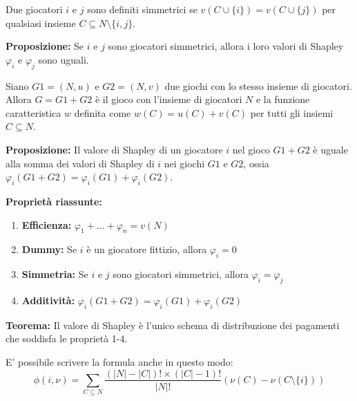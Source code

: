 \begin{definition}[Proprietà 3]

    Due giocatori $i$ e $j$ sono definiti simmetrici se $v(C \cup \{i\}) = v(C \cup
        \{j\})$ per qualsiasi insieme $C \subseteq N \setminus \{i, j\}$.

    \textbf{Proposizione:} Se $i$ e $j$ sono giocatori simmetrici, allora i loro valori di Shapley $\varphi_i$ e $\varphi_j$ sono uguali.

\end{definition}

\begin{definition}[Proprietà 4]

    Siano $G1 = (N, u)$ e $G2 = (N, v)$ due giochi con lo stesso insieme di
    giocatori. Allora $G = G1 + G2$ è il gioco con l'insieme di giocatori $N$ e la
    funzione caratteristica $w$ definita come $w(C) = u(C) + v(C)$ per tutti gli
    insiemi $C \subseteq N$.

    \textbf{Proposizione:} Il valore di Shapley di un giocatore $i$ nel gioco $G1 + G2$ è uguale alla somma dei valori di Shapley di $i$ nei giochi $G1$ e $G2$, ossia $\varphi_i(G1 + G2) = \varphi_i(G1) + \varphi_i(G2)$.

\end{definition}

\textbf{Proprietà riassunte:}
\begin{enumerate}
    \item \textbf{Efficienza:} $\varphi_1 + \ldots + \varphi_n = v(N)$
    \item \textbf{Dummy:} Se $i$ è un giocatore fittizio, allora $\varphi_i = 0$
    \item \textbf{Simmetria:} Se $i$ e $j$ sono giocatori simmetrici, allora $\varphi_i = \varphi_j$
    \item \textbf{Additività:} $\varphi_i(G1+G2) = \varphi_i(G1) + \varphi_i(G2)$
\end{enumerate}

\textbf{Teorema:} Il valore di Shapley è l'unico schema di distribuzione dei pagamenti che soddisfa le proprietà 1-4.

E' possibile scrivere la formula anche in questo modo:
\[
    \phi(i, \nu) = \sum_{C \subseteq N} \frac{(|N|-|C|)! \times (|C| -1)!}{|N|!}(\nu(C) - \nu(C\setminus \{i\}))
\]

